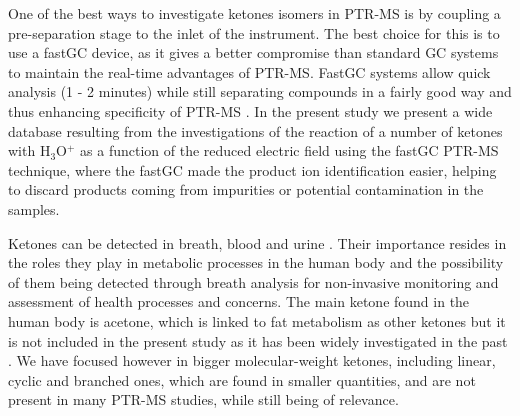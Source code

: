 One of the best ways to investigate ketones isomers in PTR-MS is by coupling a pre-separation stage to the inlet of the instrument. The best choice for this is to use a fastGC device, as it gives a better compromise than standard GC systems to maintain the real-time advantages of PTR-MS. 
FastGC systems  allow quick analysis (1 - 2 minutes) while still separating compounds in a fairly good way and thus enhancing specificity of PTR-MS \cite{ruzsanyi2013multi,romano2014wine,anderson2015measuring}.
In the present study we present a wide database resulting from the investigations of the reaction  of a number of ketones with H$_3$O$^+$ as a function of the reduced electric field using the fastGC PTR-MS technique, where the fastGC made the product ion identification easier, helping to discard products coming from impurities or potential contamination in the samples.

Ketones can be detected in breath, blood and urine \cite{de2014review}. Their importance resides in the roles they play in metabolic processes in the human body and the possibility of them being detected  through breath analysis for non-invasive monitoring and assessment of health processes and concerns. 
The main ketone found in the human body is acetone, which is linked to fat metabolism as other ketones
but  it is not included in the present study as it has been widely investigated in the past \cite{anderson2015measuring}. We have focused however in bigger molecular-weight ketones, including linear, cyclic and branched ones, which are found in smaller quantities, and are not present in many PTR-MS studies, while still being of relevance.



